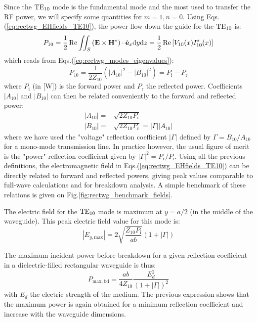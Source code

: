 Since the ${\mathrm{TE}}_{10}$ mode is the fundamental mode and the most used to transfer the RF power, we will specify some quantities for $m=1,n=0$. Using Eqs.(\ref{eq:rectwg_EHfields_TE10}), the power flow down the guide for the ${\mathrm{TE}}_{10}$ is:
\begin{equation}
	P_{10} = \frac{1}{2} \Re \iint_S  \left({\mathbf E} \times {\mathbf H}^* \right)\cdot \hat{{\mathbf e}}_x {\mathrm{d}} y {\mathrm{d}} z
	= \frac{1}{2} \Re\left[V_{10}(x) I^*_{10}(x) \right]
	\label{eq:rectwg_poynting_TE10_V10_I10}
\end{equation}
which reads from Eqs.(\ref{eq:rectwg_modes_eigenvalues}):
\begin{equation}
	P_{10} = \frac{1}{2Z_{10}}\left(\left|A_{10}\right|^{2}-\left|B_{10}\right|^{2}\right)
	\label{eq:rectwg_poynting_TE10_A10_B10} = P_\mathrm{i} -  P_\mathrm{r}
\end{equation}
where $P_\mathrm{i}$ (in [\si{W}]) is the forward power and $P_\mathrm{r}$ the reflected power. Coefficients $|A_{10}|$ and $|B_{10}|$ can then be related conveniently to the forward and reflected power:
\begin{subequations}
	\begin{align}
	|A_{10}| =& \sqrt{2Z_{10} P_\mathrm{i}} \\
	|B_{10}| =& \sqrt{2Z_{10} P_\mathrm{r}} =  |\Gamma| |A_{10}|
	\end{align}	
\end{subequations}	
where we have used the "voltage" reflection coefficient $|\Gamma|$ defined by $\Gamma=B_{10}/A_{10}$ for a mono-mode transmission line. In practice however, the usual figure of merit is the "power" reflection coefficient given by $|\Gamma|^2 = P_\mathrm{r}/P_\mathrm{i}$. Using all the previous definitions, the electromagnetic field in Eqs.(\ref{eq:rectwg_EHfields_TE10}) can be directly related to forward and reflected powers, giving peak values comparable to full-wave calculations and for breakdown analysis. A simple benchmark of these relations is given on Fig.\ref{fig:rectwg_benchmark_fields}.

The electric field for the ${\mathrm{TE}}_{10}$ mode is maximum at $y=a/2$ (in the middle of the waveguide). This peak electric field value for this mode is:
\begin{equation}
	\left| E_{y,\mathrm{max}} \right|
	=
	2 \sqrt{\frac{Z_{10} P_\mathrm{i}}{a b }} 
		\left( 
			1 + |\Gamma|
		\right)
\end{equation}

The maximum incident power before breakdown for a given reflection coefficient in a dielectric-filled rectangular waveguide is thus:
\begin{equation}
	P_{\mathrm{max,bd}}
	= 
	\frac{a b}{4 Z_{10}} \frac{E_d^2}{\left(1 + |\Gamma|\right)^2}
\end{equation}
with $E_d$ the electric strength of the medium. The previous expression shows that the maximum power is again obtained for a minimum reflection coefficient and increase with the waveguide dimensions. 

